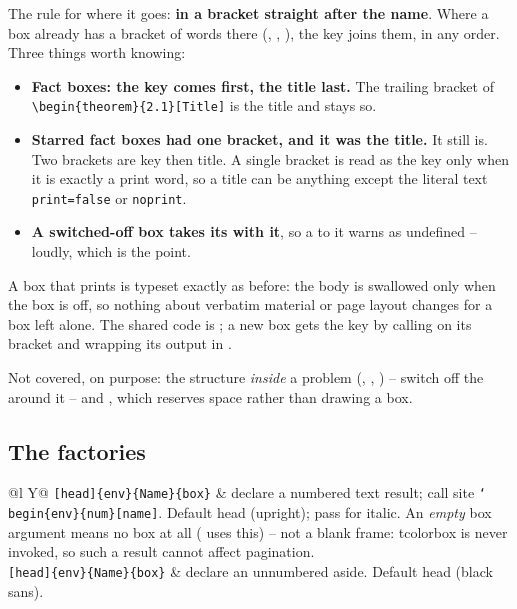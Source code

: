 The rule for where it goes: \textbf{in a bracket straight after the name}.
Where a box already has a bracket of words there (,
, ), the key joins them, in any order.
Three things worth knowing:

\begin{itemize}
  \item \textbf{Fact boxes: the key comes first, the title last.} The trailing
    bracket of \verb|\begin{theorem}{2.1}[Title]| is the title and stays so.
  \item \textbf{Starred fact boxes had one bracket, and it was the title.} It
    still is. Two brackets are key then title. A single bracket is read as the
    key only when it is exactly a print word, so a title can be anything
    except the literal text \texttt{print=false} or \texttt{noprint}.
  \item \textbf{A switched-off box takes its  with it}, so a
     to it warns as undefined -- loudly, which is the point.
\end{itemize}

A box that prints is typeset exactly as before: the body is swallowed only
when the box is off, so nothing about verbatim material or page layout
changes for a box left alone. The shared code is ; a new
box gets the key by calling  on its bracket and wrapping
its output in .

Not covered, on purpose: the structure \emph{inside} a problem
(, , ) -- switch off the
 around it -- and , which reserves space
rather than drawing a box.

\subsection*{The factories}

\begin{center}
\begin{tabularx}{\linewidth}{@{}l Y@{}}
\texttt{[head]\{env\}\{Name\}\{box\}} & declare a
  numbered text result; call site
  \texttt{\char`\\begin\{env\}\{num\}[name]}. Default head 
  (upright); pass  for italic. An \emph{empty} box argument
  means no box at all ( uses this) -- not a blank frame:
  tcolorbox is never invoked, so such a result cannot affect pagination.\\
\texttt{[head]\{env\}\{Name\}\{box\}} & declare an unnumbered
  aside. Default head  (black sans).\\
\end{tabularx}
\end{center}

